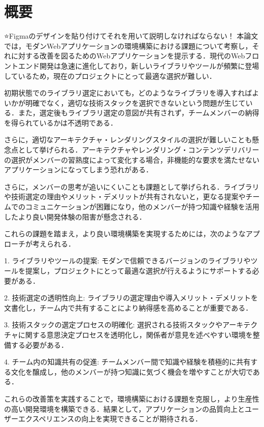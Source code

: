\documentclass[main]{subfiles}
\begin{document}
\section{概要 }
⭐️Figmaのデザインを貼り付けてそれを用いて説明しなければならない！
本論文では，モダンWebアプリケーションの環境構築における課題について考察し，それに対する改善を図るためのWebアプリケーションを提示する．現代のWebフロントエンド開発は急速に進化しており，新しいライブラリやツールが頻繁に登場しているため，現在のプロジェクトにとって最適な選択が難しい．

初期状態でのライブラリ選定においても，どのようなライブラリを導入すればよいかが明確でなく，適切な技術スタックを選択できないという問題が生じている．また，選定後もライブラリ選定の意図が共有されず，チームメンバーの納得を得られているかは不透明である．

さらに，適切なアーキテクチャ・レンダリングスタイルの選択が難しいことも懸念点として挙げられる．アーキテクチャやレンダリング・コンテンツデリバリーの選択がメンバーの習熟度によって変化する場合，非機能的な要求を満たせないアプリケーションになってしまう恐れがある．

さらに，メンバーの思考が追いにくいことも課題として挙げられる．ライブラリや技術選定の理由やメリット・デメリットが共有されないと，更なる提案やチームでのコミュニケーションが困難になり，他のメンバーが持つ知識や経験を活用したより良い開発体験の阻害が懸念される．

これらの課題を踏まえ，より良い環境構築を実現するためには，次のようなアプローチが考えられる．

1. ライブラリやツールの提案: モダンで信頼できるバージョンのライブラリやツールを提案し，プロジェクトにとって最適な選択が行えるようにサポートする必要がある．

2. 技術選定の透明性向上: ライブラリの選定理由や導入メリット・デメリットを文書化し，チーム内で共有することにより納得感を高めることが重要である．

3. 技術スタックの選定プロセスの明確化: 選択される技術スタックやアーキテクチャに関する意思決定プロセスを透明化し，関係者が意見を述べやすい環境を整備する必要がある．

4. チーム内の知識共有の促進: チームメンバー間で知識や経験を積極的に共有する文化を醸成し，他のメンバーが持つ知識に気づく機会を増やすことが大切である．

これらの改善策を実践することで，環境構築における課題を克服し，より生産性の高い開発環境を構築できる．結果として，アプリケーションの品質向上とユーザーエクスペリエンスの向上を実現できることが期待される．
\end{document}
